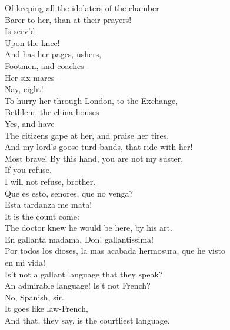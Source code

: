 \documentclass{memoir}
\begin{document}
\begin{drama*}
\facespeaks  Of keeping all the idolaters of the chamber\\
 Barer to her, than at their prayers!\\
\subtlespeaks {} Is serv'd\\
 Upon the knee!\\
\facespeaks {} And has her pages, ushers,\\
 Footmen, and coaches--\\
\subtlespeaks {} Her six mares--\\
\facespeaks {} Nay, eight!\\
\subtlespeaks  To hurry her through London, to the Exchange,\\
 Bethlem, the china-houses--\\
\facespeaks {} Yes, and have\\
 The citizens gape at her, and praise her tires,\\
 And my lord's goose-turd bands, that ride with her!\\
\kastrilspeaks  Most brave! By this hand, you are not my suster,\\
 If you refuse.\\
\pliantspeaks {} I will not refuse, brother.\\
\surlyspeaks  Que es esto, senores, que no venga?\\
 Esta tardanza me mata!\\
\facespeaks {} It is the count come:\\
 The doctor knew he would be here, by his art.\\
\subtlespeaks  En gallanta madama, Don! gallantissima!\\
\surlyspeaks  Por todos los dioses, la mas acabada hermosura, que he visto\\
 en mi vida!\\
\facespeaks {} Is't not a gallant language that they speak?\\
\kastrilspeaks  An admirable language! Is't not French?\\
\facespeaks  No, Spanish, sir.\\
\kastrilspeaks {} It goes like law-French,\\
 And that, they say, is the courtliest language.\\

\end{drama*}
\end{document}
